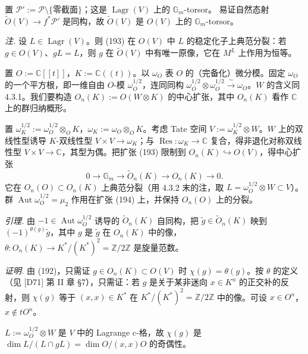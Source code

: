 
置 $\mathcal{P}':=\mathcal{P}\setminus\{\text{零截面}\}$；这是 $\operatorname{Lagr}(V)$ 上的 $\mathbb{G}_{m}$-torsor。
易证自然态射 $\tilde{O}(V)\to f^{*}\mathcal{P}'$ 是同构，故 $\tilde{O}(V)$ 是 $O(V)$ 上的 $\mathbb{G}_{m}$-torsor。

\emph{注.} 设 $L\in\operatorname{Lagr}(V)$。则 (193) 在 $O(V)$ 中 $L$ 的稳定化子上典范分裂：若 $g\in O(V)$、$gL=L$，则 $g$ 在 $\tilde{O}(V)$ 中有唯一原像，它在 $M^{L}$ 上作用为恒等。

 置 $O:=\mathbb{C}[[t]]$，$K:=\mathbb{C}((t))$。以 $\omega_{O}$ 表 $O$ 的（完备化）微分模。固定 $\omega_{O}$ 的一个平方根，即一维自由 $O$-模 $\omega_{O}^{1/2}$，连同同构 $\omega_{O}^{1/2}\otimes\omega_{O}^{1/2}\xrightarrow{\ \sim\ }\omega_{O}$。$W$ 的含义同 4.3.1。我们要构造 $O_{n}(K):=O(W\otimes K)$ 的中心扩张，其中 $O_{n}(K)$ 看作 $\mathbb{C}$ 上的群归纳概形。

置 $\omega_{K}^{1/2}:=\omega_{O}^{1/2}\otimes_{O}K$，$\omega_{K}:=\omega_{O}\otimes_{O}K$。考虑 Tate 空间 $V:=\omega_{K}^{1/2}\otimes W$。$W$ 上的双线性型诱导 $K$-双线性型 $V\times V\to\omega_{K}$；与 $\operatorname{Res}:\omega_{K}\to\mathbb{C}$ 复合，得非退化对称双线性型 $V\times V\to\mathbb{C}$，其型为偶。把扩张 (193) 限制到 $O_{n}(K)\hookrightarrow O(V)$，得中心扩张
\begin{equation}\tag{194}
0\to\mathbb{G}_{m}\to\tilde{O}_{n}(K)\to O_{n}(K)\to 0.
\end{equation}
它在 $O_{n}(O)\subset O_{n}(K)$ 上典范分裂（用 4.3.2 末的注，取 $L=\omega_{O}^{1/2}\otimes W\subset V$）。群 $\operatorname{Aut}\omega_{O}^{1/2}=\mu_{2}$ 作用在扩张 (194) 上，并保持 $O_{n}(O)$ 上的分裂。

 \emph{引理.} 由 $-1\in\operatorname{Aut}\omega_{O}^{1/2}$ 诱导的 $\tilde{O}_{n}(K)$ 自同构，把 $\tilde{g}\in\tilde{O}_{n}(K)$ 映到 $(-1)^{\theta(g)}\tilde{g}$，其中 $g$ 是 $\tilde{g}$ 在 $O_{n}(K)$ 中的像，$\theta:O_{n}(K)\to K^{*}/(K^{*})^{2}=\mathbb{Z}/2\mathbb{Z}$ 是旋量范数。

\emph{证明.} 由 (192)，只需证 $g\in O_{n}(K)\subset O(V)$ 时 $\chi(g)=\theta(g)$。按 $\theta$ 的定义（见 [D71] 第 II 章 §7），只需证：若 $g$ 是关于某非迷向 $x\in K^{n}$ 的正交补的反射，则 $\chi(g)$ 等于 $(x,x)\in K^{*}$ 在 $K^{*}/(K^{*})^{2}=\mathbb{Z}/2\mathbb{Z}$ 中的像。可设 $x\in O^{n}$，$x\notin tO^{n}$。

$L:=\omega_{O}^{1/2}\otimes W$ 是 $V$ 中的 Lagrange c-格，故 $\chi(g)$ 是 $\dim L/(L\cap gL)=\dim O/(x,x)O$ 的奇偶性。

